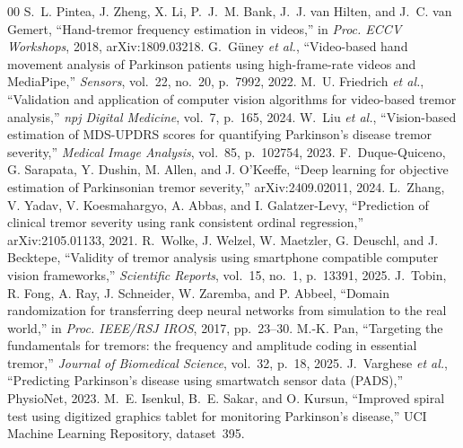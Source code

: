 \documentclass[conference]{IEEEtran}
\begin{document}
\begin{thebibliography}{00}
 S.~L. Pintea, J. Zheng, X. Li, P.~J.~M. Bank, J.~J. van
Hilten, and J.~C. van Gemert, ``Hand-tremor frequency estimation in videos,'' in
\emph{Proc. ECCV Workshops}, 2018, arXiv:1809.03218.
 G.~G\"uney \emph{et al.}, ``Video-based hand movement analysis
of Parkinson patients using high-frame-rate videos and MediaPipe,'' \emph{Sensors},
vol.~22, no.~20, p.~7992, 2022.
 M.~U. Friedrich \emph{et al.}, ``Validation and application
of computer vision algorithms for video-based tremor analysis,'' \emph{npj Digital
Medicine}, vol.~7, p.~165, 2024.
 W.~Liu \emph{et al.}, ``Vision-based estimation of MDS-UPDRS
scores for quantifying Parkinson's disease tremor severity,'' \emph{Medical Image
Analysis}, vol.~85, p.~102754, 2023.
 F.~Duque-Quiceno, G. Sarapata, Y. Dushin, M. Allen, and J.
O'Keeffe, ``Deep learning for objective estimation of Parkinsonian tremor
severity,'' arXiv:2409.02011, 2024.
 L.~Zhang, V. Yadav, V. Koesmahargyo, A. Abbas, and I.
Galatzer-Levy, ``Prediction of clinical tremor severity using rank consistent
ordinal regression,'' arXiv:2105.01133, 2021.
 R.~Wolke, J. Welzel, W. Maetzler, G. Deuschl, and J. Becktepe,
``Validity of tremor analysis using smartphone compatible computer vision
frameworks,'' \emph{Scientific Reports}, vol.~15, no.~1, p.~13391, 2025.
 J.~Tobin, R. Fong, A. Ray, J. Schneider, W. Zaremba, and P.
Abbeel, ``Domain randomization for transferring deep neural networks from
simulation to the real world,'' in \emph{Proc. IEEE/RSJ IROS}, 2017, pp.~23--30.
 M.-K. Pan, ``Targeting the fundamentals for tremors: the
frequency and amplitude coding in essential tremor,'' \emph{Journal of Biomedical
Science}, vol.~32, p.~18, 2025.
 J.~Varghese \emph{et al.}, ``Predicting Parkinson's disease
using smartwatch sensor data (PADS),'' PhysioNet, 2023.
 M.~E. Isenkul, B.~E. Sakar, and O. Kursun, ``Improved spiral test
using digitized graphics tablet for monitoring Parkinson's disease,'' UCI Machine
Learning Repository, dataset~395.
\end{thebibliography}
\end{document}
